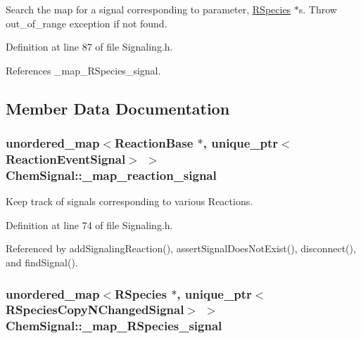 Search the map for a signal corresponding to parameter, \hyperlink{classRSpecies}{R\+Species} $\ast$s. Throw out\+\_\+of\+\_\+range exception if not found. 



Definition at line 87 of file Signaling.\+h.



References \+\_\+map\+\_\+\+R\+Species\+\_\+signal.



\subsection{Member Data Documentation}
\hypertarget{classChemSignal_a750129c5a876c652e76e2a008b21b276}{
\subsubsection[{\+\_\+map\+\_\+reaction\+\_\+signal}]{\setlength{\rightskip}{0pt plus 5cm}unordered\+\_\+map$<${\bf Reaction\+Base} $\ast$, unique\+\_\+ptr$<${\bf Reaction\+Event\+Signal}$>$ $>$ Chem\+Signal\+::\+\_\+map\+\_\+reaction\+\_\+signal\hspace{0.3cm}{\ttfamily [private]}}}\label{classChemSignal_a750129c5a876c652e76e2a008b21b276}


Keep track of signals corresponding to various Reactions. 



Definition at line 74 of file Signaling.\+h.



Referenced by add\+Signaling\+Reaction(), assert\+Signal\+Does\+Not\+Exist(), disconnect(), and find\+Signal().

\hypertarget{classChemSignal_a01513b0756cb765b0fd02a7e5497133d}{
\subsubsection[{\+\_\+map\+\_\+\+R\+Species\+\_\+signal}]{\setlength{\rightskip}{0pt plus 5cm}unordered\+\_\+map$<${\bf R\+Species} $\ast$, unique\+\_\+ptr$<${\bf R\+Species\+Copy\+N\+Changed\+Signal}$>$ $>$ Chem\+Signal\+::\+\_\+map\+\_\+\+R\+Species\+\_\+signal\hspace{0.3cm}{\ttfamily [private]}}}\label{classChemSignal_a01513b0756cb765b0fd02a7e5497133d}


